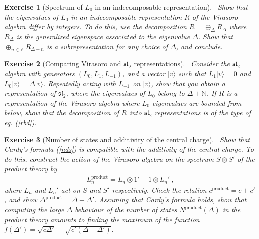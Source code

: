 \documentclass[12pt,a4paper,notitlepage]{report}
\newcommand \Z {\mathbb{Z}}
\newcommand \N {\mathbb{N}}
\numberwithin{equation}{section}
\theoremstyle{break}
\newtheorem{exo}{Exercise}[chapter]
\begin{document}
\begin{exo}[Spectrum of $L_0$ in an indecomposable representation]
 ~\label{exodiffint}
Show that the eigenvalues of $L_0$ in an indecomposable representation $R$ of the Virasoro algebra differ by integers.
To do this, use the decomposition $R=\oplus_\Delta R_\Delta$ where $R_\Delta$ is the generalized eigenspace associated to the eigenvalue $\Delta$.
Show that  $\oplus_{n\in\Z} R_{\Delta+n}$ is a subrepresentation for any choice of $\Delta$, and conclude. 
\end{exo}

\begin{exo}[Comparing Virasoro and $\mathfrak{sl}_2$ representations]
 ~\label{exodis}
Consider the $\mathfrak{sl}_2$ algebra with generators $(L_0,L_1,L_{-1})$, and a vector $|v\rangle$ such that $L_1|v\rangle = 0 $ and $L_0|v\rangle = \Delta |v\rangle$.
Repeatedly acting with $L_{-1}$ on $|v\rangle$, show that you obtain a representation of $\mathfrak{sl}_2$, where the eigenvalues of $L_0$ belong to $\Delta+\N$.
If $R$ is a representation of the Virasoro algebra where $L_0$-eigenvalues are bounded from below, show that the decomposition of $R$ into $\mathfrak{sl}_2$ representations is of the type of eq. (\ref{rbd}).
\end{exo}


\begin{exo}[Number of states and additivity of the central charge]
 ~\label{exoacf} 
Show that Cardy's formula (\ref{nds}) is compatible with the additivity of the central charge.
To do this, construct the action of the Virasoro algebra on the spectrum $S\otimes S'$ of the product theory by 
\begin{align}
 L_n^\mathrm{product} = L_n\otimes 1' + 1\otimes L_n'\ ,
\end{align}
where $L_n$ and $L_n'$ act on $S$ and $S'$ respectively.
Check the relation $c^\mathrm{product} = c+c'$, and show $\Delta^\mathrm{product} = \Delta+\Delta'$.
Assuming that Cardy's formula holds, show that computing the large $\Delta$ behaviour of the number of states $N^\mathrm{product}(\Delta)$ in the product theory amounts to finding the maximum of the function $f(\Delta') = \sqrt{c\Delta'} +\sqrt{c'(\Delta-\Delta')}$.
\end{exo}





\printindex
\end{document}
